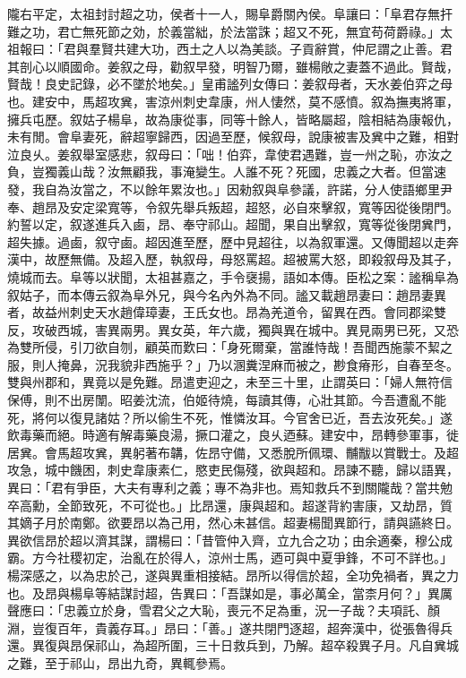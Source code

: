 \begin{pinyinscope}
隴右平定，太祖封討超之功，侯者十一人，賜阜爵關內侯。阜讓曰：「阜君存無扞難之功，君亡無死節之効，於義當絀，於法當誅；超又不死，無宜苟荷爵祿。」太祖報曰：「君與羣賢共建大功，西土之人以為美談。子貢辭賞，仲尼謂之止善。君其剖心以順國命。姜叙之母，勸叙早發，明智乃爾，雖楊敞之妻蓋不過此。賢哉，賢哉！良史記錄，必不墜於地矣。」皇甫謐列女傳曰：姜叙母者，天水姜伯弈之母也。建安中，馬超攻兾，害涼州刺史韋康，州人悽然，莫不感憤。叙為撫夷將軍，擁兵屯歷。叙姑子楊阜，故為康從事，同等十餘人，皆略屬超，陰相結為康報仇，未有閒。會阜妻死，辭超寧歸西，因過至歷，候叙母，說康被害及兾中之難，相對泣良乆。姜叙舉室感悲，叙母曰：「咄！伯弈，韋使君遇難，豈一州之恥，亦汝之負，豈獨義山哉？汝無顧我，事淹變生。人誰不死？死國，忠義之大者。但當速發，我自為汝當之，不以餘年累汝也。」因勑叙與阜參議，許諾，分人使語鄉里尹奉、趙昂及安定梁寬等，令叙先舉兵叛超，超怒，必自來擊叙，寬等因從後閉門。約誓以定，叙遂進兵入鹵，昂、奉守祁山。超聞，果自出擊叙，寬等從後閉兾門，超失據。過鹵，叙守鹵。超因進至歷，歷中見超往，以為叙軍還。又傳聞超以走奔漢中，故歷無備。及超入歷，執叙母，母怒罵超。超被罵大怒，即殺叙母及其子，燒城而去。阜等以狀聞，太祖甚嘉之，手令襃揚，語如本傳。臣松之案：謐稱阜為叙姑子，而本傳云叙為阜外兄，與今名內外為不同。謐又載趙昂妻曰：趙昂妻異者，故益州刺史天水趙偉璋妻，王氏女也。昂為羌道令，留異在西。會同郡梁雙反，攻破西城，害異兩男。異女英，年六歲，獨與異在城中。異見兩男已死，又恐為雙所侵，引刀欲自刎，顧英而歎曰：「身死爾棄，當誰恃哉！吾聞西施蒙不絜之服，則人掩鼻，況我貌非西施乎？」乃以溷糞涅麻而被之，尠食瘠形，自春至冬。雙與州郡和，異竟以是免難。昂遣吏迎之，未至三十里，止謂英曰：「婦人無符信保傅，則不出房闈。昭姜沈流，伯姬待燒，每讀其傳，心壯其節。今吾遭亂不能死，將何以復見諸姑？所以偷生不死，惟憐汝耳。今官舍已近，吾去汝死矣。」遂飲毒藥而絕。時適有解毒藥良湯，撅口灌之，良乆迺蘇。建安中，昂轉參軍事，徙居兾。會馬超攻兾，異躬著布韝，佐昂守備，又悉脫所佩環、黼黻以賞戰士。及超攻急，城中饑困，刺史韋康素仁，愍吏民傷殘，欲與超和。昂諫不聽，歸以語異，異曰：「君有爭臣，大夫有專利之義；專不為非也。焉知救兵不到關隴哉？當共勉卒高勳，全節致死，不可從也。」比昂還，康與超和。超遂背約害康，又劫昂，質其嫡子月於南鄭。欲要昂以為己用，然心未甚信。超妻楊聞異節行，請與讌終日。異欲信昂於超以濟其謀，謂楊曰：「昔管仲入齊，立九合之功；由余適秦，穆公成霸。方今社稷初定，治亂在於得人，涼州士馬，迺可與中夏爭鋒，不可不詳也。」楊深感之，以為忠於己，遂與異重相接結。昂所以得信於超，全功免禍者，異之力也。及昂與楊阜等結謀討超，告異曰：「吾謀如是，事必萬全，當柰月何？」異厲聲應曰：「忠義立於身，雪君父之大恥，喪元不足為重，況一子哉？夫項託、顏淵，豈復百年，貴義存耳。」昂曰：「善。」遂共閉門逐超，超奔漢中，從張魯得兵還。異復與昂保祁山，為超所圍，三十日救兵到，乃解。超卒殺異子月。凡自兾城之難，至于祁山，昂出九奇，異輒參焉。


\end{pinyinscope}
